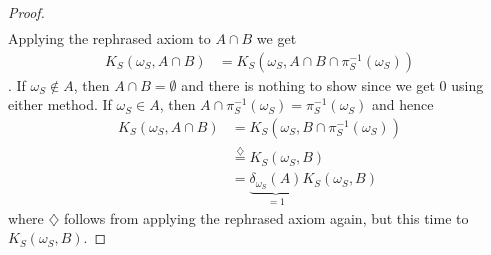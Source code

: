 \documentclass[../main.tex]{subfiles}
\begin{document}
\begin{proof}
\begin{align*}
        \end{align*}
        Applying the rephrased axiom to ${A\cap B}$ we get
        \begin{align*}
            K_S(\omega_S, A\cap B) &= K_S(\omega_S, A\cap B \cap \pi^{-1}_S(\omega_S))
        \end{align*}.
        If ${\omega_S\notin A}$, then ${A\cap B = \emptyset}$ and there is nothing to show since we get ${0}$ using either method. If ${\omega_S\in A}$, then ${A\cap \pi_S^{-1}(\omega_S)=\pi_S^{-1}(\omega_S)}$ and hence 
        \begin{align*}
            K_S(\omega_S, A\cap B) &= K_S(\omega_S, B \cap \pi^{-1}_S(\omega_S))\\
            &\stackrel{\diamondsuit}{=}K_S(\omega_S, B)\\
            &= \underbrace{\delta_{\omega_S}(A)}_{=1}K_S(\omega_S, B)
        \end{align*}
        where ${\diamondsuit}$ follows from applying the rephrased axiom again, but this time to ${K_S(\omega_S, B)}$. 
    \end{proof}
\end{document}
